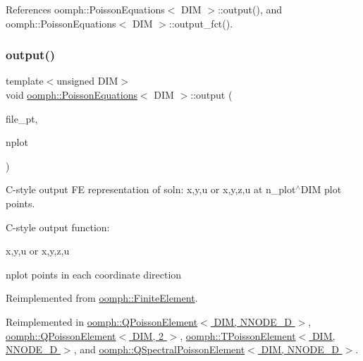 References oomph\+::\+Poisson\+Equations$<$ D\+I\+M $>$\+::output(), and oomph\+::\+Poisson\+Equations$<$ D\+I\+M $>$\+::output\+\_\+fct().

\mbox{\label{classoomph_1_1PoissonEquations_abc30eee5faaa50a65b272012d17ba604}} 
\subsubsection{\texorpdfstring{output()}{output()}\hspace{0.1cm}{\footnotesize\ttfamily [4/4]}}
{\footnotesize\ttfamily template$<$unsigned D\+IM$>$ \\
void \hyperlink{classoomph_1_1PoissonEquations}{oomph\+::\+Poisson\+Equations}$<$ D\+IM $>$\+::output (\begin{DoxyParamCaption}\item[{F\+I\+LE $\ast$}]{file\+\_\+pt,  }\item[{const unsigned \&}]{nplot }\end{DoxyParamCaption})\hspace{0.3cm}{\ttfamily [virtual]}}



C-\/style output FE representation of soln\+: x,y,u or x,y,z,u at n\+\_\+plot$^\wedge$\+D\+IM plot points. 

C-\/style output function\+:

x,y,u or x,y,z,u

nplot points in each coordinate direction 

Reimplemented from \hyperlink{classoomph_1_1FiniteElement_adfaee690bb0608f03320eeb9d110d48c}{oomph\+::\+Finite\+Element}.



Reimplemented in \hyperlink{classoomph_1_1QPoissonElement_af6fd3511d4cd349ffa7dff0549fdaefe}{oomph\+::\+Q\+Poisson\+Element$<$ D\+I\+M, N\+N\+O\+D\+E\+\_\+D $>$}, \hyperlink{classoomph_1_1QPoissonElement_af6fd3511d4cd349ffa7dff0549fdaefe}{oomph\+::\+Q\+Poisson\+Element$<$ D\+I\+M, 2 $>$}, \hyperlink{classoomph_1_1TPoissonElement_a9abacba6348984ea82fa08bdf8ff2f9e}{oomph\+::\+T\+Poisson\+Element$<$ D\+I\+M, N\+N\+O\+D\+E\+\_\+D $>$}, and \hyperlink{classoomph_1_1QSpectralPoissonElement_aa3a03bc9793e976facde1a49396f5b43}{oomph\+::\+Q\+Spectral\+Poisson\+Element$<$ D\+I\+M, N\+N\+O\+D\+E\+\_\+D $>$}.



